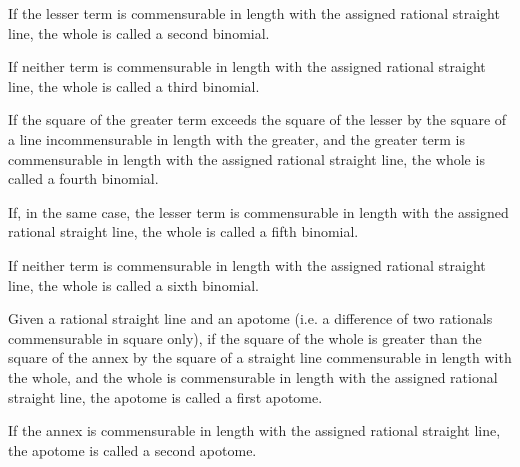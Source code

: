 \documentclass{rrxiv}
\begin{document}
\begin{scope}
\label{def:X.II.2}
If the lesser term is commensurable in length with the assigned
rational straight line, the whole is called a second binomial.
\end{scope}

\begin{scope}
\label{def:X.II.3}
If neither term is commensurable in length with the assigned rational
straight line, the whole is called a third binomial.
\end{scope}

\begin{scope}
\label{def:X.II.4}
If the square of the greater term exceeds the square of the lesser by
the square of a line incommensurable in length with the greater, and
the greater term is commensurable in length with the assigned
rational straight line, the whole is called a fourth binomial.
\end{scope}

\begin{scope}
\label{def:X.II.5}
If, in the same case, the lesser term is commensurable in length with
the assigned rational straight line, the whole is called a fifth
binomial.
\end{scope}

\begin{scope}
\label{def:X.II.6}
If neither term is commensurable in length with the assigned rational
straight line, the whole is called a sixth binomial.
\end{scope}


\begin{scope}
\label{def:X.III.1}
Given a rational straight line and an apotome (i.e. a difference of
two rationals commensurable in square only), if the square of the
whole is greater than the square of the annex by the square of a
straight line commensurable in length with the whole, and the whole
is commensurable in length with the assigned rational straight line,
the apotome is called a first apotome.
\end{scope}

\begin{scope}
\label{def:X.III.2}
If the annex is commensurable in length with the assigned rational
straight line, the apotome is called a second apotome.
\end{scope}
\end{document}
